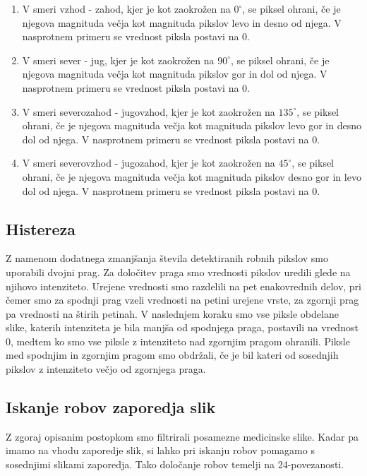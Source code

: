 \documentclass{article}
\begin{document}
    \begin{enumerate}
        \item V smeri vzhod - zahod, kjer je kot zaokrožen na $0^{\circ}$, se piksel ohrani, če je njegova 
        magnituda večja kot magnituda pikslov levo in desno od njega. V nasprotnem primeru se vrednost piksla 
        postavi na 0.
        \item V smeri sever - jug, kjer je kot zaokrožen na $90^{\circ}$, se piksel ohrani, če je njegova 
        magnituda večja kot magnituda pikslov gor in dol od njega. V nasprotnem primeru se vrednost piksla 
        postavi na 0.
        \item V smeri severozahod - jugovzhod, kjer je kot zaokrožen na $135^{\circ}$, se piksel ohrani, če je njegova 
        magnituda večja kot magnituda pikslov levo gor in desno dol od njega. V nasprotnem primeru se vrednost piksla 
        postavi na 0.
        \item V smeri severovzhod - jugozahod, kjer je kot zaokrožen na $45^{\circ}$, se piksel ohrani, če je njegova 
        magnituda večja kot magnituda pikslov desno gor in levo dol od njega. V nasprotnem primeru se vrednost piksla 
        postavi na 0.
    \end{enumerate}

    \subsection{Histereza}
    Z namenom dodatnega zmanjšanja števila detektiranih robnih pikslov smo uporabili dvojni prag. 
    Za določitev praga smo vrednosti pikslov uredili glede na njihovo intenziteto. Urejene vrednosti smo 
    razdelili na pet enakovrednih delov, pri čemer smo za spodnji prag vzeli vrednosti na petini urejene vrste, 
    za zgornji prag pa vrednosti na štirih petinah. V naslednjem koraku smo vse piksle obdelane slike, katerih 
    intenziteta je bila manjša od spodnjega praga, postavili na vrednost 0, medtem ko smo vse piksle z intenziteto 
    nad zgornjim pragom ohranili. Piksle med spodnjim in zgornjim pragom smo obdržali, če je bil kateri od sosednjih 
    pikslov z intenziteto večjo od zgornjega praga. 

    \subsection{Iskanje robov zaporedja slik}
    Z zgoraj opisanim postopkom smo filtrirali posamezne medicinske slike. Kadar pa imamo na vhodu zaporedje slik, si lahko
    pri iskanju robov pomagamo s sosednjimi slikami zaporedja. Tako določanje robov temelji na 24-povezanosti.
\end{document}
